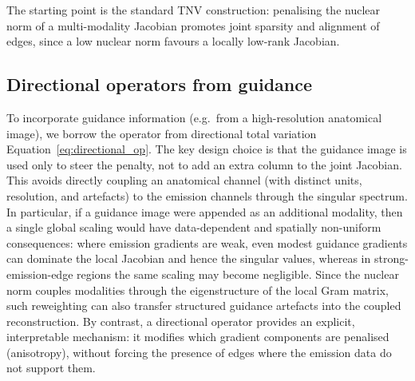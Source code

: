 The starting point is the standard TNV construction: penalising the nuclear norm of a multi-modality Jacobian promotes joint sparsity and alignment of edges, since a low nuclear norm favours a locally low-rank Jacobian.

\subsection{Directional operators from guidance}
\label{subsec:directional_from_guidance}

To incorporate guidance information (e.g.\ from a high-resolution anatomical image), we borrow the operator from directional total variation Equation~\ref{eq:directional_op}. The key design choice is that the guidance image is used only to steer the penalty, not to add an extra column to the joint Jacobian. This avoids directly coupling an anatomical channel (with distinct units, resolution, and artefacts) to the emission channels through the singular spectrum. In particular, if a guidance image were appended as an additional modality, then a single global scaling would have data-dependent and spatially non-uniform consequences: where emission gradients are weak, even modest guidance gradients can dominate the local Jacobian and hence the singular values, whereas in strong-emission-edge regions the same scaling may become negligible. Since the nuclear norm couples modalities through the eigenstructure of the local Gram matrix, such reweighting can also transfer structured guidance artefacts into the coupled reconstruction. By contrast, a directional operator provides an explicit, interpretable mechanism: it modifies which gradient components are penalised (anisotropy), without forcing the presence of edges where the emission data do not support them.

